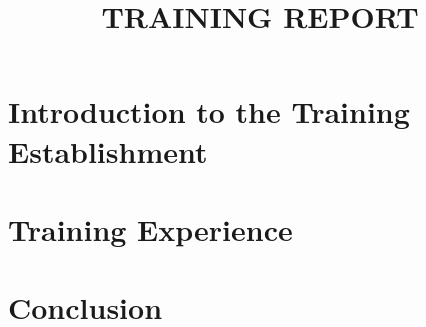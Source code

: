 \documentclass[12pt] {article}
\title{TRAINING REPORT}
\begin{document}


\newpage

\tableofcontents
\newpage
\listoffigures
\listoftables
\newpage
{}


\newpage
\section{Introduction to the Training Establishment}


\newpage
\section{Training Experience}







\newpage
\section{Conclusion}


\newpage



 

\end{document}
